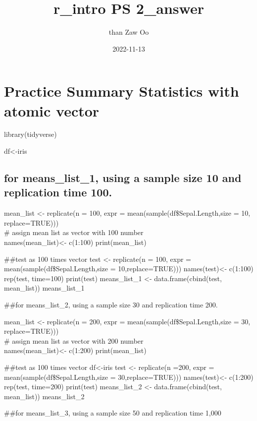 \documentclass[
]{article}
\title{r\_intro PS 2\_answer}
\author{than Zaw Oo}
\date{2022-11-13}
\begin{document}
\maketitle

\hypertarget{practice-summary-statistics-with-atomic-vector}{%
\section{Practice Summary Statistics with atomic
vector}\label{practice-summary-statistics-with-atomic-vector}}

library(tidyverse)

df\textless-iris

\hypertarget{for-means_list_1-using-a-sample-size-10-and-replication-time-100.}{%
\subsection{for means\_list\_1, using a sample size 10 and replication
time
100.}\label{for-means_list_1-using-a-sample-size-10-and-replication-time-100.}}

mean\_list \textless- replicate(n = 100, expr =
mean(sample(df\$Sepal.Length,size = 10, replace=TRUE)))\\
\# assign mean list as vector with 100 number\\
names(mean\_list)\textless- c(1:100) print(mean\_list)

\#\#test as 100 times vector test \textless- replicate(n = 100, expr =
mean(sample(df\$Sepal.Length,size = 10,replace=TRUE)))
names(test)\textless- c(1:100) rep(test, time=100) print(test)
means\_list\_1 \textless- data.frame(cbind(test, mean\_list))
means\_list\_1

\#\#for means\_list\_2, using a sample size 30 and replication time 200.

mean\_list \textless- replicate(n = 200, expr =
mean(sample(df\$Sepal.Length,size = 30, replace=TRUE)))\\
\# assign mean list as vector with 200 number\\
names(mean\_list)\textless- c(1:200) print(mean\_list)

\#\#test as 100 times vector df\textless-iris test \textless-
replicate(n =200, expr = mean(sample(df\$Sepal.Length,size =
30,replace=TRUE))) names(test)\textless- c(1:200) rep(test, time=200)
print(test) means\_list\_2 \textless- data.frame(cbind(test,
mean\_list)) means\_list\_2

\#\#for means\_list\_3, using a sample size 50 and replication time
1,000
\end{document}
